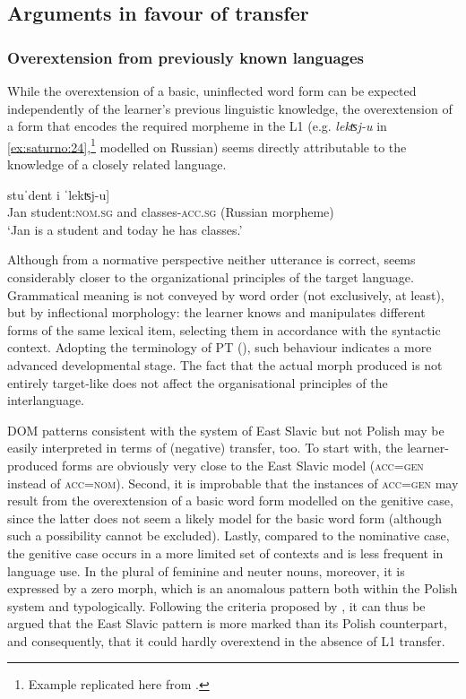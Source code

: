 \documentclass[output=paper,            colorlinks, citecolor=brown            		  ]{langscibook}
\begin{document}
\subsection{Arguments in favour of transfer}\label{sec:saturno:4.1}
\subsubsection{Overextension from previously known languages}\label{sec:saturno:4.1.1}

While the overextension of a basic, uninflected word form can be expected independently of the learner’s previous linguistic knowledge, the overextension of a form that encodes the required morpheme in the L1 (e.g. \textit{lekʦj-u} in \ref{ex:saturno:24},\footnote{{Example replicated here from  .}} modelled on Russian) seems directly attributable to the knowledge of a closely related language.

\begin{exe}%
    \gll {[jan}   stuˈdent     i   {{}ˈlekʦj-u]}\\
  Jan  student:\textsc{nom.sg}  and  {classes-\textsc{acc.sg} (Russian morpheme)}\\ 
    \glt  ‘Jan is a student and today he has classes.’
\end{exe}

Although from a normative perspective neither utterance is correct,  seems considerably closer to the organizational principles of the target language. Grammatical meaning is not conveyed by word order (not exclusively, at least), but by inflectional morphology: the learner knows and manipulates different forms of the same lexical item, selecting them in accordance with the syntactic context. Adopting the terminology of PT (), such behaviour indicates a more advanced developmental stage. The fact that the actual morph produced is not entirely target-like does not affect the organisational principles of the interlanguage. 

DOM patterns consistent with the system of East Slavic but not Polish may be easily interpreted in terms of (negative) transfer, too. To start with, the learner-produced forms are obviously very close to the East Slavic model (\textsc{acc=gen} instead of \textsc{acc=nom}). Second, it is improbable that the instances of \textsc{acc=gen} may result from the overextension of a basic word form modelled on the genitive case, since the latter does not seem a likely model for the basic word form (although such a possibility cannot be excluded). Lastly, compared to the nominative case, the genitive case occurs in a more limited set of contexts and is less frequent in language use. In the plural of feminine and neuter nouns, moreover, it is expressed by a zero morph, which is an anomalous pattern both within the Polish system and typologically. Following the criteria proposed by \citet[72--91]{Croft1990}, it can thus be argued that the East Slavic pattern is more marked than its Polish counterpart, and consequently, that it could hardly overextend in the absence of L1 transfer.
\end{document}
